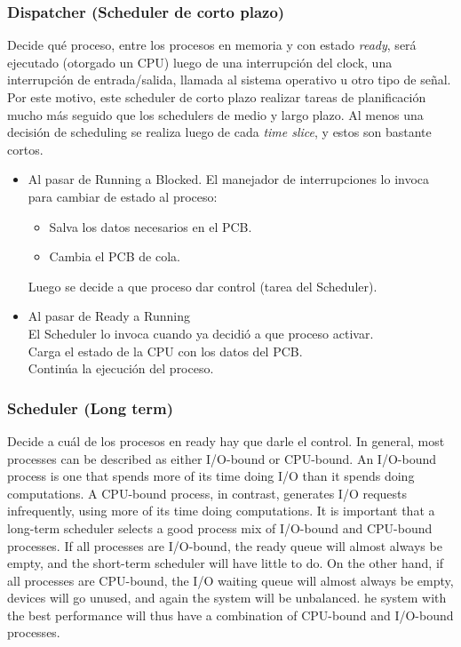 \documentclass[a4paper, twoside]{article}
\begin{document}
\subsubsection{Dispatcher (Scheduler de corto plazo)}
Decide qué proceso, entre los procesos en memoria y con estado \emph{ready}, será ejecutado (otorgado un CPU) luego de una interrupción del clock, una interrupción de entrada/salida, llamada al sistema operativo u otro tipo de señal. Por este motivo, este scheduler de corto plazo realizar tareas de planificación mucho más seguido que los schedulers de medio y largo plazo. Al menos una decisión de scheduling se realiza luego de cada \emph{time slice}, y estos son bastante cortos.

\begin{itemize}
	\item Al pasar de Running a Blocked.
	El manejador de interrupciones lo invoca para cambiar de estado al proceso:
	\begin{itemize}
		\item Salva los datos necesarios en el PCB.
		\item Cambia el PCB de cola.
	\end{itemize}
	Luego se decide a que proceso dar control (tarea del Scheduler).

	\item Al pasar de Ready a Running \\
	El Scheduler lo invoca cuando ya decidió a que proceso activar. \\
	Carga el estado de la CPU con los datos del PCB. \\
	Continúa la ejecución del proceso.
\end{itemize}

\subsubsection{Scheduler (Long term)}
Decide a cuál de los procesos en ready hay que darle el control.
In general, most processes can be described as either I/O-bound or CPU-bound. An I/O-bound process is one that spends more of its time doing I/O than it spends doing computations. A CPU-bound process, in contrast, generates I/O requests infrequently, using more of its time doing computations.
It is important that a long-term scheduler selects a good process mix of I/O-bound and CPU-bound processes. If all processes are I/O-bound, the ready queue will almost always be empty, and the short-term scheduler will have little to do. On the other hand, if all processes are CPU-bound, the I/O waiting queue will almost always be empty, devices will go unused, and again the system will be unbalanced.
he system with the best performance will thus have a combination of CPU-bound and I/O-bound processes.\\
\end{document}
